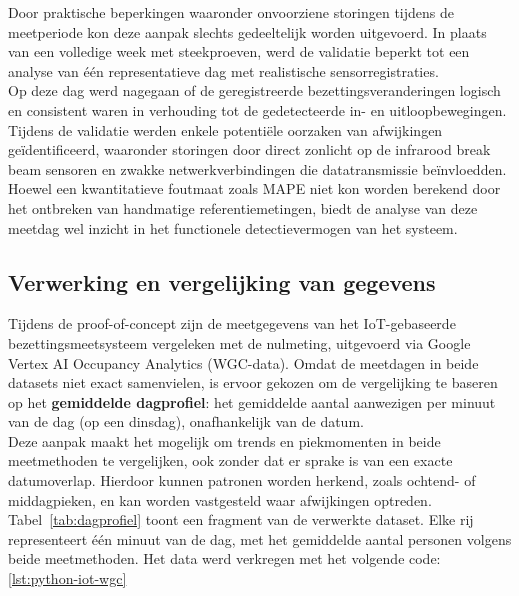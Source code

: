 Door praktische beperkingen waaronder onvoorziene storingen tijdens de meetperiode kon deze aanpak slechts gedeeltelijk worden uitgevoerd. In plaats van een volledige week met steekproeven, werd de validatie beperkt tot een analyse van één representatieve dag met realistische sensorregistraties. \\

Op deze dag werd nagegaan of de geregistreerde bezettingsveranderingen logisch en consistent waren in verhouding tot de gedetecteerde in- en uitloopbewegingen. Tijdens de validatie werden enkele potentiële oorzaken van afwijkingen geïdentificeerd, waaronder storingen door direct zonlicht op de infrarood break beam sensoren en zwakke netwerkverbindingen die datatransmissie beïnvloedden. \\

Hoewel een kwantitatieve foutmaat zoals MAPE niet kon worden berekend door het ontbreken van handmatige referentiemetingen, biedt de analyse van deze meetdag wel inzicht in het functionele detectievermogen van het systeem.

\subsection{Verwerking en vergelijking van gegevens}
Tijdens de proof-of-concept zijn de meetgegevens van het IoT-gebaseerde bezettingsmeetsysteem vergeleken met de nulmeting, uitgevoerd via Google Vertex AI Occupancy Analytics (WGC-data). Omdat de meetdagen in beide datasets niet exact samenvielen, is ervoor gekozen om de vergelijking te baseren op het \textbf{gemiddelde dagprofiel}: het gemiddelde aantal aanwezigen per minuut van de dag (op een dinsdag), onafhankelijk van de datum. \\

Deze aanpak maakt het mogelijk om trends en piekmomenten in beide meetmethoden te vergelijken, ook zonder dat er sprake is van een exacte datumoverlap. Hierdoor kunnen patronen worden herkend, zoals ochtend- of middagpieken, en kan worden vastgesteld waar afwijkingen optreden. \\

Tabel~\ref{tab:dagprofiel} toont een fragment van de verwerkte dataset. Elke rij representeert één minuut van de dag, met het gemiddelde aantal personen volgens beide meetmethoden. Het data werd verkregen met het volgende code: \ref{lst:python-iot-wgc}

